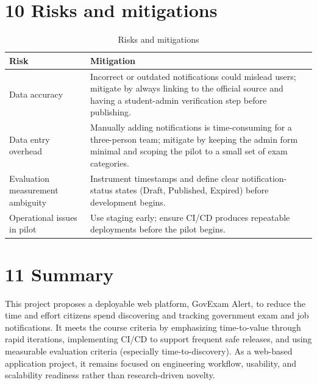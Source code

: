 \documentclass[11pt,a4paper]{article}
\begin{document}
\section*{10 Risks and mitigations}
\begin{table}[h]
\centering
\begin{tabular}{|p{3.7cm}|p{9.5cm}|}
\hline
\textbf{Risk} & \textbf{Mitigation} \\
\hline
Data accuracy & Incorrect or outdated notifications could mislead users; mitigate by always linking to the official source and having a student-admin verification step before publishing. \\
\hline
Data entry overhead & Manually adding notifications is time-consuming for a three-person team; mitigate by keeping the admin form minimal and scoping the pilot to a small set of exam categories. \\
\hline
Evaluation measurement ambiguity & Instrument timestamps and define clear notification-status states (Draft, Published, Expired) before development begins. \\
\hline
Operational issues in pilot & Use staging early; ensure CI/CD produces repeatable deployments before the pilot begins. \\
\hline
\end{tabular}
\caption{Risks and mitigations}
\end{table}

\section*{11 Summary}
This project proposes a deployable web platform, GovExam Alert, to reduce the
time
and effort citizens spend discovering and tracking government exam and job
notifications. It meets the course criteria by emphasizing time-to-value
through rapid iterations, implementing CI/CD to support frequent safe
releases, and using measurable evaluation criteria (especially
time-to-discovery). As a web-based application project, it remains focused on engineering workflow, usability, and scalability readiness rather than research-driven novelty.
\end{document}
